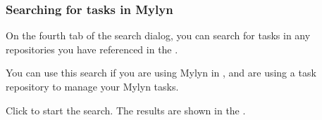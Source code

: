 \subsubsection{Searching for tasks in Mylyn}
\label{TasksSearchTasks}

On the fourth tab of the search dialog, you can search for tasks in any repositories you have referenced in the \gdproject{}.

You can use this search if you are using Mylyn in \jb{}, and are using a task repository to manage your Mylyn tasks.

Click  to start the search. The results are shown in the \gdsearchresultview{} . 
